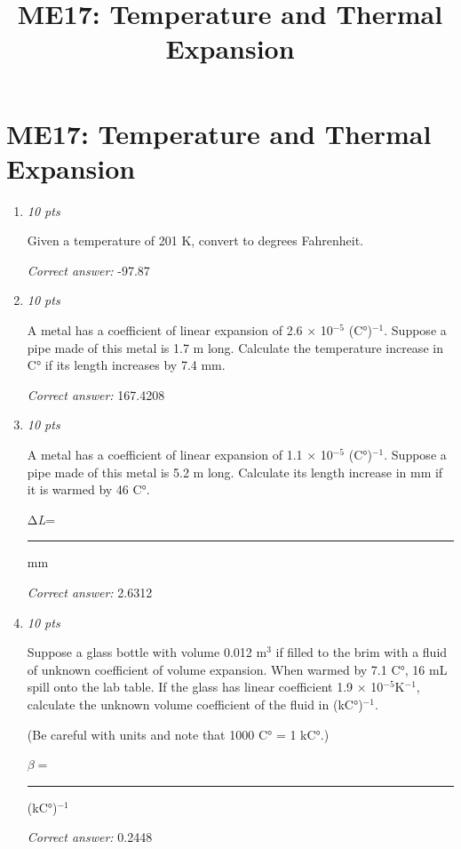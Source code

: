 \documentclass[11pt]{article}
\title{ME17: Temperature and Thermal Expansion}
\author{}
\date{}
\begin{document}
\maketitle

\section*{ME17: Temperature and Thermal Expansion}

\begin{enumerate}[leftmargin=*,label=\textbf{Question \arabic*.}]

\item \hfill \textit{10 pts}

Given a temperature of 201 K, convert to degrees Fahrenheit.

\textit{Correct answer:} -97.87

\item \hfill \textit{10 pts}

A metal has a coefficient of linear expansion of 2.6 × 10$^{-5}$ (C°)$^{-1}$.  Suppose a pipe made of this metal is 1.7 m long. Calculate the temperature increase in C° if its length increases by 7.4 mm.

\textit{Correct answer:} 167.4208

\item \hfill \textit{10 pts}

A metal has a coefficient of linear expansion of 1.1 × 10$^{-5}$ (C°)$^{-1}$. Suppose a pipe made of this metal is 5.2 m long. Calculate its length increase in mm if it is warmed by 46 C°.



Δ\emph{L}= \rule{2.5cm}{0.4pt} mm

\textit{Correct answer:} 2.6312

\item \hfill \textit{10 pts}

Suppose a glass bottle with volume 0.012 m$^{3}$ if filled to the brim with a fluid of unknown coefficient of volume expansion. When warmed by 7.1 C°, 16 mL spill onto the lab table. If the glass has linear coefficient 1.9 × 10$^{-5}$K$^{-1}$, calculate the unknown volume coefficient of the fluid in (kC°)$^{-1}$.

(Be careful with units and note that 1000 C°  = 1 kC°.)



 $\beta=$  \rule{2.5cm}{0.4pt} (kC°)$^{-1}$

\textit{Correct answer:} 0.2448


\end{enumerate}
\end{document}

